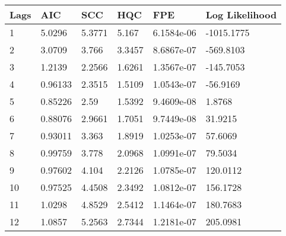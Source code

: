 \begin{tabular}{llllll}
\toprule 
Lags & AIC & SCC & HQC & FPE & Log Likelihood \\ 
\midrule 
1 & 5.0296 & 5.3771 & 5.167 & 6.1584e-06 & -1015.1775 \\ 
2 & 3.0709 & 3.766 & 3.3457 & 8.6867e-07 & -569.8103 \\ 
3 & 1.2139 & 2.2566 & 1.6261 & 1.3567e-07 & -145.7053 \\ 
4 & 0.96133 & 2.3515 & 1.5109 & 1.0543e-07 & -56.9169 \\ 
5 & 0.85226 & 2.59 & 1.5392 & 9.4609e-08 & 1.8768 \\ 
6 & 0.88076 & 2.9661 & 1.7051 & 9.7449e-08 & 31.9215 \\ 
7 & 0.93011 & 3.363 & 1.8919 & 1.0253e-07 & 57.6069 \\ 
8 & 0.99759 & 3.778 & 2.0968 & 1.0991e-07 & 79.5034 \\ 
9 & 0.97602 & 4.104 & 2.2126 & 1.0785e-07 & 120.0112 \\ 
10 & 0.97525 & 4.4508 & 2.3492 & 1.0812e-07 & 156.1728 \\ 
11 & 1.0298 & 4.8529 & 2.5412 & 1.1464e-07 & 180.7683 \\ 
12 & 1.0857 & 5.2563 & 2.7344 & 1.2181e-07 & 205.0981 \\ 
\bottomrule 
\end{tabular}